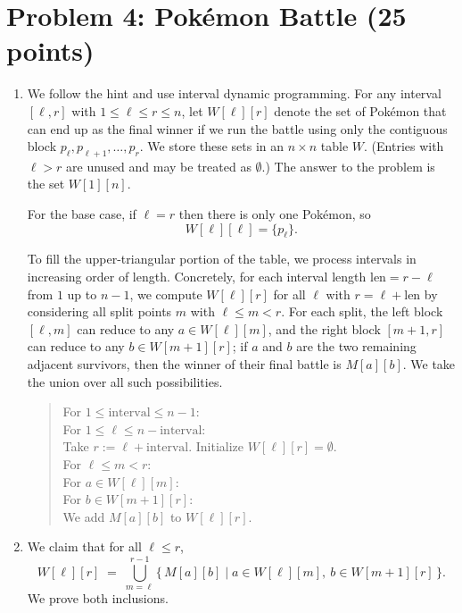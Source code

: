 \documentclass[12pt]{article}
\newenvironment{pseudocode}{
\begin{quote}
\ttfamily
}{
\end{quote}
}
\newcommand{\I}{\hspace*{2em}}      %
\newcommand{\II}{\hspace*{4em}}    %
\newcommand{\III}{\hspace*{6em}}   %
\newcommand{\IV}{\hspace*{8em}}   %
\newcommand{\V}{\hspace*{10em}}   %
\begin{document}
\section*{Problem 4: Pok\'{e}mon Battle (25 points)}
\begin{enumerate}
\item[(a)] We follow the hint and use interval dynamic programming. For any interval
$[\ell,r]$ with $1 \le \ell \le r \le n$, let $W[\ell][r]$ denote the set of Pok\'emon that can
end up as the final winner if we run the battle using only the contiguous block
$p_\ell, p_{\ell+1}, \dots, p_r$. We store these sets in an $n \times n$ table $W$.
(Entries with $\ell > r$ are unused and may be treated as $\emptyset$.) The answer to
the problem is the set $W[1][n]$.

For the base case, if $\ell=r$ then there is only one Pok\'emon, so
\[
W[\ell][\ell] = \{p_\ell\}.
\]

To fill the upper-triangular portion of the table, we process intervals in increasing
order of length. Concretely, for each interval length $\mathrm{len}=r-\ell$ from $1$ up to $n-1$,
we compute $W[\ell][r]$ for all $\ell$ with $r=\ell+\mathrm{len}$ by considering all split points
$m$ with $\ell \le m < r$. For each split, the left block $[\ell,m]$ can reduce to any
$a \in W[\ell][m]$, and the right block $[m+1,r]$ can reduce to any
$b \in W[m+1][r]$; if $a$ and $b$ are the two remaining adjacent survivors, then the
winner of their final battle is $M[a][b]$. We take the union over all such possibilities.

\begin{pseudocode}
    For $1 \le \mathrm{interval} \le n-1$:\\
    \I For $1 \le \ell \le n - \mathrm{interval}$: \\
    \II Take $r := \ell + \mathrm{interval}$. Initialize $W[\ell][r] = \emptyset.$\\
    \II For $\ell \le m < r$: \\
    \III For $a \in W[\ell][m]$:\\
    \IV For $b \in W[m+1][r]$:\\
    \V We add $M[a][b]$ to $W[\ell][r]$.
\end{pseudocode}




\item[(b)] We claim that for all $\ell \le r$,
\[
W[\ell][r] \;=\; \bigcup_{m=\ell}^{r-1} \{\, M[a][b] \mid a \in W[\ell][m],\ b \in W[m+1][r] \,\}.
\]
We prove both inclusions.


\end{enumerate}
\end{document}
